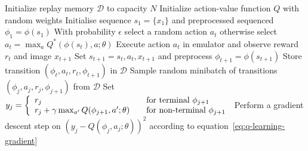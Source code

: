 \documentclass{article} %
\begin{document}

\begin{algorithm}[t]
\begin{algorithmic}
\State Initialize replay memory $\mathcal{D}$ to capacity $N$
\State Initialize action-value function $Q$ with random weights
\State Initialise sequence $s_1 = \{x_1\}$ and preprocessed sequenced $\phi_1 = \phi(s_1)$
	\State With probability $\epsilon$ select a random action $a_t$
	\State otherwise select $a_t = \max_{a} Q^*(\phi(s_t), a; \theta)$
	\State Execute action $a_t$ in emulator and observe reward $r_t$ and image $x_{t+1}$
	\State Set $s_{t+1} = s_t,a_t,x_{t+1}$ and preprocess $\phi_{t+1} = \phi(s_{t+1})$
	\State Store transition $\left(\phi_t,a_t,r_t,\phi_{t+1}\right)$ in $\mathcal{D}$
	\State Sample random minibatch of transitions $\left(\phi_j,a_j,r_j,\phi_{j+1}\right)$ from $\mathcal{D}$
	\State Set
	$y_j =
    \left\{
    \begin{array}{l l}
      r_j  \quad & \text{for terminal } \phi_{j+1}\\
      r_j + \gamma \max_{a'} Q(\phi_{j+1}, a'; \theta) \quad & \text{for non-terminal } \phi_{j+1}
    \end{array} \right.$
	\State Perform a gradient descent step on $\left(y_j - Q(\phi_j, a_j; \theta) \right)^2$ according to equation~\ref{eq:q-learning-gradient}
\EndFor
\EndFor
\end{algorithmic}
\caption{Deep Q-learning with Experience Replay}
\label{alg}
\end{algorithm}

\end{document}
